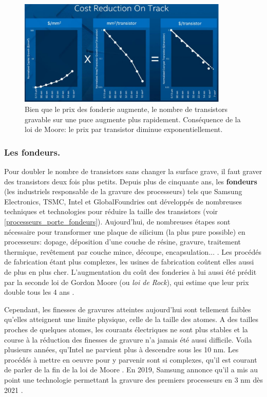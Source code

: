 \begin{figure}
    \center
    \includegraphics[width=10cm]{images/processeurs_porte_moore.png}
    \caption{\label{pic_Moore_explique} Bien que le prix des fonderie augmente, le nombre de transistors gravable sur une puce augmente plus rapidement. Conséquence de la loi de Moore: le prix par transistor diminue exponentiellement.}
\end{figure}



\subsubsection{Les fondeurs.}
Pour doubler le nombre de transistors sans changer la surface grave, il faut graver des transistors deux fois plus petits. 
Depuis plus de cinquante ans, les \textbf{fondeurs} (les industriels responsable de la gravure des processeurs) tels que Samsung Electronics, TSMC, Intel et GlobalFoundries ont développés de nombreuses techniques et technologies pour réduire la taille des transistors (voir \autoref{processeurs_porte_fondeurs}). Aujourd'hui, de nombreuses étapes sont nécessaire pour transformer une plaque de silicium (la plus pure possible) en processeurs: dopage, déposition d'une couche de résine, gravure, traitement thermique, revêtement par couche mince, découpe, encapsulation... \cite{AnthonyNelzinSantos2018}.
Les procédés de fabrication étant plus complexes, les usines de fabrication coûtent elles aussi de plus en plus cher. L'augmentation du coût des fonderies à lui aussi été prédit par la seconde loi de Gordon Moore (ou \textit{loi de Rock}), qui estime que leur prix double tous les 4 ans \cite{schaller1997moore}.


Cependant, les finesses de gravures atteintes aujourd'hui sont tellement faibles qu'elles atteignent une limite physique, celle de la taille des atomes. A des tailles proches de quelques atomes, les courants électriques ne sont plus stables et la course à la réduction des finesses de gravure n'a jamais été aussi difficile.
Voila plusieurs années, qu'Intel ne parvient plus à descendre sous les 10 nm. Les procédés à mettre en oeuvre pour y parvenir sont si complexes, qu'il est courant de parler de la fin de la loi de Moore \cite{theis2017end}.
En 2019, Samsung annonce qu'il a mis au point une technologie permettant la gravure des premiers processeurs en 3 nm dès 2021 \cite{AdrianBRANCO2019}. 


